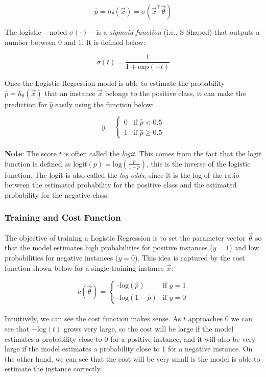 $$\hat{p} = h_{\theta}(\vec{x}) = \sigma(\vec{x}^{\intercal}\vec{\theta})$$

\noindent 
The logistic -- noted $\sigma(\cdot)$ -- is a \textit{sigmoid function} (i.e., S-Shaped)
that outputs a number between 0 and 1. It is defined below:

$$\sigma(t) = \frac{1}{1 + \text{exp}(-t)}$$

\noindent 
Once the Logistic Regression model is able to estimate the probability $\hat{p} = h_{\theta}(\vec{x})$
that an instance $\vec{x}$ belongs to the positive class, it can make the prediction for $\hat{y}$
easily using the function below:

\[ \hat{y} = 
\begin{cases} 
    0 & \text{if } \hat{p} < 0.5 \\
    1 & \text{if } \hat{p} \geq  0.5 
\end{cases}
\] \\

\noindent 
\textbf{Note}: The score $t$ is often called the \textit{logit}. This comes from the 
fact that the logit function is defined as $\text{logit}(p) = \text{log}(\frac{p}{1-p})$, this is
the inverse of the logistic function. The logit is also called the \textit{log-odds}, since it is
the log of the ratio between the estimated probability for the positive class and the estimated
probability for the negative class.

\subsubsection{Training and Cost Function}

The objective of training a Logistic Regression is to set the parameter vector $\vec{\theta}$ so 
that the model estimates high probabilities for positive instances ($y = 1$) and low probabilities
for negative instances ($y = 0$). This idea is captured by the cost function shown below for a 
single training instance $\vec{x}$:

\[ c(\vec{\theta}) = 
\begin{cases} 
    \text{-log}(\hat{p}) & \text{if } y = 1 \\
    \text{-log}(1 - \hat{p}) & \text{if } y = 0
\end{cases}
\] \\

\noindent 
Intuitively, we can see the cost function makes sense. As $t$ approaches 0 we can see that 
$-\text{log}(t)$ grows very large, so the cost will be large if the model estimates a probability
close to 0 for a positive instance, and it will also be very large if the model estimates a 
probability close to 1 for a negative instance. On the other hand, we can see that the cost will
be very small is the model is able to estimate the instance correctly. \\

